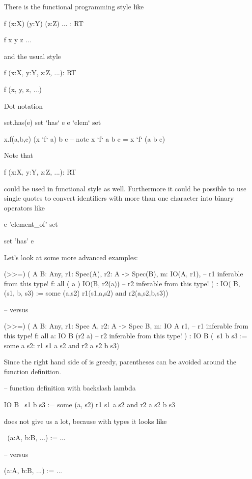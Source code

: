 There is the functional programming style like
%
\begin{alba}
  f (x:X) (y:Y) (z:Z) ... : RT

  f x y z ...
\end{alba}
%
and the usual style
%
\begin{alba}
  f (x:X, y:Y, z:Z, ...): RT

  f (x, y, z, ...)
\end{alba}
%
%
Dot notation
%
\begin{alba}
  set.has(e)                           set `has` e
                                       e `elem` set

  x.f(a,b,c)                           (x `f` a) b c
                                       -- note
                                       x `f` a b c =  x `f` (a b c)
\end{alba}
%
Note that
%
\begin{alba}
  f (x:X, y:Y, z:Z, ...): RT
\end{alba}
%
could be used in functional style as well. Furthermore it could be possible to
use single quotes to convert identifiers with more than one character into
binary operators like
%
\begin{alba}
  e 'element_of' set

  set 'has' e
\end{alba}
%

Let's look at some more advanced examples:
%
\begin{alba}
  (>>=) ( A B: Any, r1: Spec(A), r2: A -> Spec(B),
          m: IO(A, r1),       -- r1 inferable from this type!
          f: all ( a )
               IO(B, r2(a))   -- r2 inferable from this type!
        )
        : IO( B,
              (s1, b, s3) :=
                  some (a,s2)
                    r1(s1,a,s2) and
                    r2(a,s2,b,s3))

  -- versus

  (>>=) ( A B: Any, r1: Spec A, r2: A -> Spec B,
          m: IO A r1,         -- r1 inferable from this type!
          f: all a:
               IO B (r2 a)    -- r2 inferable from this type!
        )
        : IO  B
              (\ s1 b s3 :=
                  some a s2:
                    r1 s1 a s2 and
                    r2 a s2 b s3)

\end{alba}
%
Since the right hand side of \code{:=} is greedy, parentheses can be avoided
around the function definition.
%
\begin{alba}
  -- function definition with backslash lambda

          IO  B
              \ s1 b s3 :=
                  some (a, s2)
                    r1 s1 a s2 and
                    r2 a s2 b s3
\end{alba}
%
does not give us a lot, because with types it looks like
%
\begin{alba}
  \ (a:A, b:B, ...) :=
        ...

  -- versus

  (a:A, b:B, ...) :=
        ...
\end{alba}


